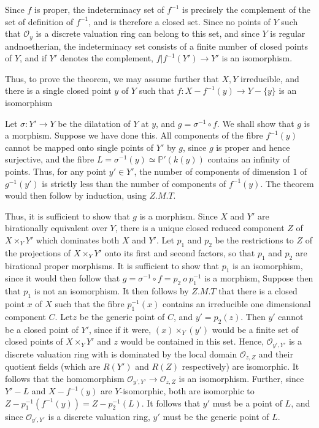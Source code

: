  Since $f$ is proper, the indeterminacy set of $f^{-1}$ is precisely
 the complement of the set of definition of $f^{-1}$, and is therefore
 a closed set. Since no points of $Y$ such that $\mathscr{O}_{y}$ is a
 discrete valuation ring can belong to this set, and since $Y$ is
 regular and\pageoriginale noetherian, the indeterminacy set consists of a finite
 number of closed points of $Y$, and if $Y'$ denotes the complement,
 $f | f^{-1}(Y')\to Y'$ is an isomorphism. 
 
 Thus, to prove	the theorem, we may assume further that $X,Y$
 irreducible, and there is a single closed point $y$ of $Y$ such that
 $f:X - f^{-1}(y) \to Y - \{y\}$ is an isomorphism 
 
 Let $\sigma : Y' \to Y$ be the dilatation of $Y$ at $y$, and $g =
 \sigma^{-1} \circ f$. We shall show that $g$ is a morphism. Suppose we
 have done this. All components of the fibre $f^{-1}(y)$ cannot be
 mapped onto single points of $Y'$ by $g$, since $g$ is proper and
 hence surjective, and the fibre $L = \sigma^{-1}(y)\simeq
 \mathbb{P'}(k(y))$ contains an infinity of points. Thus, for any
 point $y' \in Y'$, the number of components of dimension $1$ of
 $g^{-1}(y')$ is strictly less than the number of components of
 $f^{-1}(y)$. The theorem would then follow by induction, using
 $Z.M.T$.  
 
 Thus, it is sufficient to show that $g$ is a morphism. Since $X$ and
 $Y'$ are birationally equivalent over $Y$, there is a unique closed
 reduced component $Z$ of $X \times_{Y} Y'$ which dominates both $X$
 and $Y'$. Let $p_{1}$ and $p_{2}$ be the restrictions to $Z$ of the
 projections of $X \times_{Y}Y'$ onto its first and second factors, so
 that $p_{1}$ and $p_{2}$ are birational proper morphisms. It is
 sufficient to show that $p_{1}$ is an isomorphism, since it would
 then follow that $g = \sigma^{-1} \circ f = p_{2}~ o~ p^{-1}_{1}$ is
 a morphism, Suppose then that $p_{1}$ is not an isomorphism. It then
 follows by $Z.M.T$ that there is a closed point $x$ of $X$ such that
 the fibre $p^{-1}_{1}(x)$ contains an irreducible one dimensional
 component $C$. Let\pageoriginale $z$ be the generic point  of $C$, and $y' =
 p_{2}(z)$. Then $y'$ cannot be a closed point of $Y'$, since if it
 were, $(x) \times_{Y} (y')$ would be a finite set of closed points of
 $X \times_{Y} Y'$ and $z$ would be contained in this set. Hence,
 $\mathscr{O}_{y', Y'}$ is a discrete valuation ring with is dominated
 by the local domain $\mathscr{O}_{z, Z}$ and their quotient fields
 (which are $R(Y')$ and $R(Z)$ respectively) are isomorphic. It
 follows that the homomorphism $\mathscr{O}_{y',Y'} \to
 \mathscr{O}_{z, Z}$ is an isomorphism. Further, since $Y'-L$ and $X
 - f^{-1}(y)$ are $Y$-isomorphic, both are isomorphic to $Z -
 p^{-1}_{1}(f^{-1}(y)) = Z - p^{-1}_{2}(L)$. It follows that $y'$ must
 be a point of $L$, and since $\mathscr{O}_{y',Y'}$ is a discrete
 valuation ring, $y'$ must be the generic point of $L$. 
 
